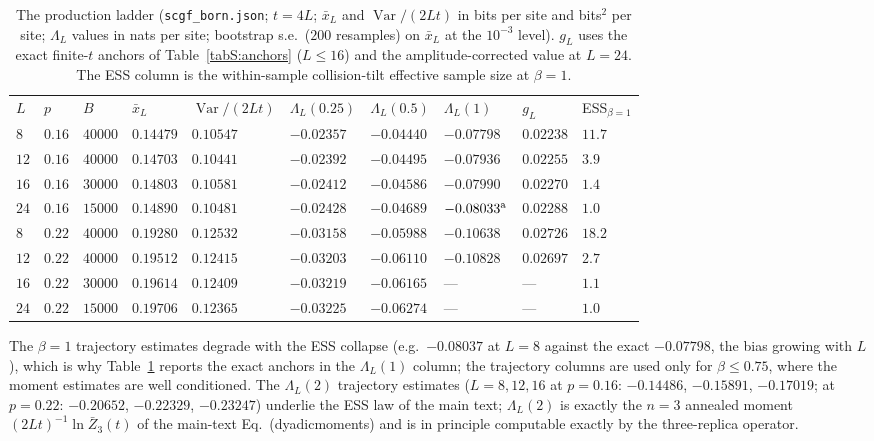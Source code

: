 \documentclass[aps,prx,reprint,superscriptaddress,nobibnotes,longbibliography]{revtex4-2}
\begin{document}
\begin{table}[t]
\caption{The production ladder (\texttt{scgf\_born.json}; $t=4L$;
$\bar x_L$ and $\operatorname{Var}/(2Lt)$ in bits per site and bits$^2$
per site; $\Lambda_L$ values in nats per site; bootstrap s.e.\ ($200$
resamples) on $\bar x_L$ at the $10^{-3}$ level).  $g_L$ uses the exact
finite-$t$ anchors of Table~\ref{tabS:anchors} ($L\le16$) and the
amplitude-corrected value at $L=24$.  The ESS column is the within-sample
collision-tilt effective sample size at $\beta=1$.}
\label{tabS:ladder}
\begin{ruledtabular}
\begin{tabular}{llllllllll}
$L$ & $p$ & $B$ & $\bar x_L$ & $\operatorname{Var}/(2Lt)$ &
$\Lambda_L(0.25)$ & $\Lambda_L(0.5)$ & $\Lambda_L(1)$ & $g_L$ &
ESS$_{\beta=1}$\\
\colrule
$8$ & $0.16$ & $40000$ & $0.14479$ & $0.10547$ & $-0.02357$ & $-0.04440$
 & $-0.07798$ & $0.02238$ & $11.7$\\
$12$ & $0.16$ & $40000$ & $0.14703$ & $0.10441$ & $-0.02392$ & $-0.04495$
 & $-0.07936$ & $0.02255$ & $3.9$\\
$16$ & $0.16$ & $30000$ & $0.14803$ & $0.10581$ & $-0.02412$ & $-0.04586$
 & $-0.07990$ & $0.02270$ & $1.4$\\
$24$ & $0.16$ & $15000$ & $0.14890$ & $0.10481$ & $-0.02428$ & $-0.04689$
 & $-0.08033^{\rm a}$ & $0.02288$ & $1.0$\\
$8$ & $0.22$ & $40000$ & $0.19280$ & $0.12532$ & $-0.03158$ & $-0.05988$
 & $-0.10638$ & $0.02726$ & $18.2$\\
$12$ & $0.22$ & $40000$ & $0.19512$ & $0.12415$ & $-0.03203$ & $-0.06110$
 & $-0.10828$ & $0.02697$ & $2.7$\\
$16$ & $0.22$ & $30000$ & $0.19614$ & $0.12409$ & $-0.03219$ & $-0.06165$
 & --- & --- & $1.1$\\
$24$ & $0.22$ & $15000$ & $0.19706$ & $0.12365$ & $-0.03225$ & $-0.06274$
 & --- & --- & $1.0$\\
\end{tabular}
\end{ruledtabular}
\end{table}

The $\beta=1$ trajectory estimates degrade with the ESS collapse
(e.g.\ $-0.08037$ at $L=8$ against the exact $-0.07798$, the bias growing
with $L$), which is why Table~\ref{tabS:ladder} reports the exact anchors
in the $\Lambda_L(1)$ column; the trajectory columns are used only for
$\beta\le0.75$, where the moment estimates are well conditioned.  The
$\Lambda_L(2)$ trajectory estimates ($L=8,12,16$ at $p=0.16$:
$-0.14486$, $-0.15891$, $-0.17019$; at $p=0.22$: $-0.20652$,
$-0.22329$, $-0.23247$) underlie the ESS law of the main text;
$\Lambda_L(2)$ is exactly the $n=3$ annealed moment
$(2Lt)^{-1}\ln\bar Z_3(t)$ of the main-text Eq.~(dyadicmoments) and is in
principle computable exactly by the three-replica operator.
\end{document}
